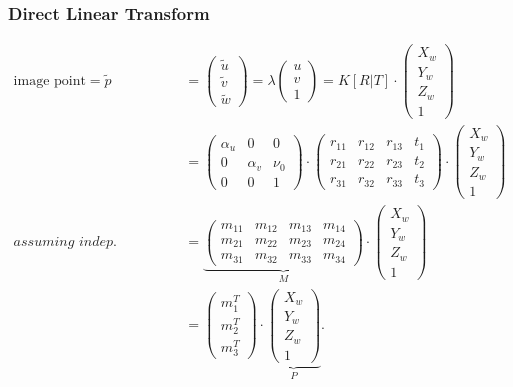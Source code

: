 \documentclass[a4paper,12 pt]{article}
\theoremstyle{definition}
\theoremstyle{remark}
\theoremstyle{definition}
\theoremstyle{definition}
\theoremstyle{definition}
\theoremstyle{remark}
\theoremstyle{definition}
\begin{document}
\subsubsection*{Direct Linear Transform}
\begin{equation}
\begin{split}
\text{image point}=\tilde{p}&=\begin{pmatrix}
\tilde{u}\\
\tilde{v}\\
\tilde{w}
\end{pmatrix} = \lambda \begin{pmatrix}
 u\\
 v\\
 1
 \end{pmatrix}=K[R|T]\cdot \begin{pmatrix}
 X_w\\
 Y_w\\
 Z_w\\
 1
 \end{pmatrix}\\
 &=\begin{pmatrix}
\alpha_u &0&0\\
0&\alpha_v &\nu_0\\
0&0&1
\end{pmatrix}\cdot \begin{pmatrix}
 r_{11}&r_{12}&r_{13}&t_1\\
 r_{21}&r_{22}&r_{23}&t_2\\
 r_{31}&r_{32}&r_{33}&t_3
 \end{pmatrix}\cdot \begin{pmatrix}
 X_w\\
 Y_w\\
 Z_w\\
 1
 \end{pmatrix}\\
\textit{assuming indep. elements} \qquad &=\underbrace{\begin{pmatrix}
 m_{11}&m_{12}&m_{13}&m_{14}\\
 m_{21}&m_{22}&m_{23}&m_{24}\\
 m_{31}&m_{32}&m_{33}&m_{34}
 \end{pmatrix}}_{M}\cdot \begin{pmatrix}
 X_w\\
 Y_w\\
 Z_w\\
 1
 \end{pmatrix}\\
 &=\begin{pmatrix}
m_1^T\\
m_2^T\\
m_3^T
\end{pmatrix}\cdot \underbrace{\begin{pmatrix}
 X_w\\
 Y_w\\
 Z_w\\
 1
 \end{pmatrix}}_{P}.
 \end{split}
\end{equation}
\end{document}
